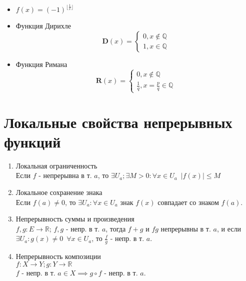\documentclass[11pt, a4paper, utf-8]{article}
\def\R{\mathbb{R}}
\def\Q{\mathbb{Q}}
\def\sp{\, \, \,}
\begin{document}
\begin{enumerate}
\begin{enumerate}
\begin{itemize}
                \item $f(x) = (-1)^{\lfloor \frac{1}{x} \rfloor}$
            \end{itemize}
        \end{enumerate}
        \begin{itemize}
            \item Функция Дирихле
            $$\mathbf{D}(x) = \begin{cases}
                0, x \not\in \Q \\
                1, x \in \Q
            \end{cases}$$
            \item Функция Римана
            $$\mathbf{R}(x) = \begin{cases}
                0, x \not\in \Q \\
                \frac{1}{q}, x = \frac{p}{q} \in \Q
            \end{cases}$$
        \end{itemize}
    \end{enumerate}
    
    \section{Локальные свойства непрерывных функций}
    \begin{enumerate}
        \item Локальная ограниченность\\
        Если $f$ - непрерывна в т. $a$, то $\exists U_a; \exists M > 0: \forall x \in U_a \sp |f(x)| \leq M$
        \item Локальное сохранение знака\\
        Если $f(a) \neq 0$, то $\exists U_a : \forall x \in U_a$ знак $f(x)$ совпадает со знаком $f(a)$.
        \item Непрерывность суммы и произведения\\
        $f,g: E \to \R$; $f, g$ - непр. в т. $a$, тогда $f+g$ и $fg$ непрерывны в т. $a$, и если $\exists U_a : g(x) \neq 0 \sp \forall x \in U_a$, то $\frac{f}{g}$ - непр. в т. $a$.
        \item Непрерывность композиции\\
        $f: X \to Y; g: Y \to \R$\\
        $f$ - непр. в т. $a \in X \implies g \circ f$ - непр. в т. $a$.
    \end{enumerate}
\end{document}
